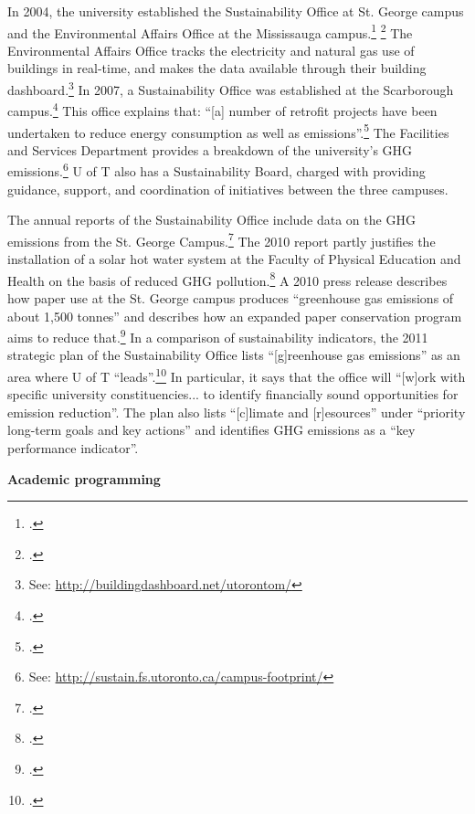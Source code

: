 In 2004, the university established the Sustainability Office at St. George campus and the Environmental Affairs Office at the Mississauga campus.\footcite[][]{UTSustOffice} \footcite[][]{UTEAOffice}
The Environmental Affairs Office tracks the electricity and natural gas use of buildings in real-time, and makes the data available through their building dashboard.\footnote{See: \url{http://buildingdashboard.net/utorontom/}}
In 2007, a Sustainability Office was established at the Scarborough campus.\footcite[See: ][]{UTSustOffice}
This office explains that: ``[a] number of retrofit projects have been undertaken to reduce energy consumption as well as  emissions''.\footcite[][]{UTSustOfficeEnergy}
The Facilities and Services Department provides a breakdown of the university's GHG emissions.\footnote{See: \url{http://sustain.fs.utoronto.ca/campus-footprint/}}
U of T also has a Sustainability Board, charged with providing guidance, support, and coordination of initiatives between the three campuses.



The annual reports of the Sustainability Office include data on the GHG emissions from the St. George Campus.\footcite[][]{UTSustOffice2010report}
The 2010 report partly justifies the installation of a solar hot water system at the Faculty of Physical Education and Health on the basis of reduced GHG pollution.\footcite[][p. 17]{UTSustOffice2010report}
A 2010 press release describes how paper use at the St. George campus produces ``greenhouse gas emissions of about 1,500 tonnes'' and describes how an expanded paper conservation program aims to reduce that.\footcite[][]{UTGoingGreener2010}
In a comparison of sustainability indicators, the 2011 strategic plan of the Sustainability Office lists ``[g]reenhouse gas emissions'' as an area where U of T ``leads''.\footcite[][p. 1]{UTSustOfficePlan}
In particular, it says that the office will ``[w]ork with specific university constituencies... to identify financially sound opportunities for emission reduction''.
The plan also lists ``[c]limate and [r]esources'' under ``priority long-term goals and key actions'' and identifies GHG emissions as a ``key performance indicator''.




\textbf{Academic programming}
\label{UofTAcademicProgramming}


